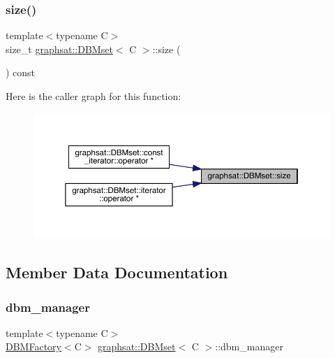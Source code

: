 \mbox{\label{classgraphsat_1_1_d_b_mset_a78f9765db0ac92c5b3247973b0e757bb}} 
\subsubsection{\texorpdfstring{size()}{size()}}
{\footnotesize\ttfamily template$<$typename C$>$ \\
size\+\_\+t \mbox{\hyperlink{classgraphsat_1_1_d_b_mset}{graphsat\+::\+D\+B\+Mset}}$<$ C $>$\+::size (\begin{DoxyParamCaption}{ }\end{DoxyParamCaption}) const\hspace{0.3cm}{\ttfamily [inline]}}

Here is the caller graph for this function\+:
\nopagebreak
\begin{figure}[H]
\begin{center}
\leavevmode
\includegraphics[width=350pt]{classgraphsat_1_1_d_b_mset_a78f9765db0ac92c5b3247973b0e757bb_icgraph}
\end{center}
\end{figure}


\subsection{Member Data Documentation}
\mbox{\label{classgraphsat_1_1_d_b_mset_aa24554b9389c7743a5aad5c3c75ceb44}} 
\subsubsection{\texorpdfstring{dbm\_manager}{dbm\_manager}}
{\footnotesize\ttfamily template$<$typename C$>$ \\
\mbox{\hyperlink{classgraphsat_1_1_d_b_m_factory}{D\+B\+M\+Factory}}$<$C$>$ \mbox{\hyperlink{classgraphsat_1_1_d_b_mset}{graphsat\+::\+D\+B\+Mset}}$<$ C $>$\+::dbm\+\_\+manager\hspace{0.3cm}{\ttfamily [private]}}

